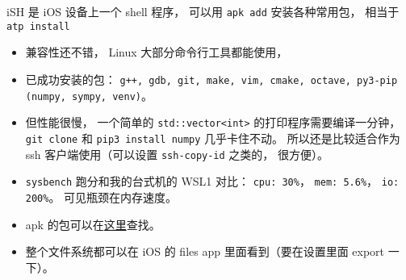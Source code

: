 

\begin{issues}
\issueDraft
\end{issues}

iSH 是 iOS 设备上一个 shell 程序， 可以用 \verb`apk add` 安装各种常用包， 相当于 \verb`atp install`

\begin{itemize}
\item 兼容性还不错， Linux 大部分命令行工具都能使用，
\item 已成功安装的包： \verb`g++, gdb, git, make, vim, cmake, octave, py3-pip (numpy, sympy, venv)`。
\item 但性能很慢， 一个简单的 \verb`std::vector<int>` 的打印程序需要编译一分钟， \verb`git clone` 和 \verb`pip3 install numpy` 几乎卡住不动。 所以还是比较适合作为 ssh 客户端使用（可以设置 \verb`ssh-copy-id` 之类的， 很方便）。
\item \verb`sysbench` 跑分和我的台式机的 WSL1 对比： \verb`cpu: 30%`， \verb`mem: 5.6%`， \verb`io: 200%`。 可见瓶颈在内存速度。
\item apk 的包可以在\href{https://pkgs.alpinelinux.org/}{这里}查找。
\item 整个文件系统都可以在 iOS 的 files app 里面看到（要在设置里面 export 一下）。
\end{itemize}
